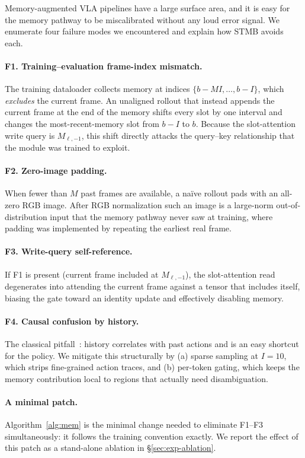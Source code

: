 \documentclass[11pt]{article}
\begin{document}
Memory-augmented VLA pipelines have a large surface area, and it is easy for
the memory pathway to be miscalibrated without any loud error signal. We
enumerate four failure modes we encountered and explain how STMB avoids each.

\paragraph{F1. Training--evaluation frame-index mismatch.}
The training dataloader collects memory at indices $\{b - M I, \dots, b - I\}$,
which \emph{excludes} the current frame. An unaligned rollout that instead
appends the current frame at the end of the memory shifts every slot by one
interval and changes the most-recent-memory slot from $b - I$ to $b$.
Because the slot-attention write query is $M_{\ell,-1}$, this shift directly
attacks the query--key relationship that the module was trained to exploit.

\paragraph{F2. Zero-image padding.}
When fewer than $M$ past frames are available, a na\"ive rollout pads with an
all-zero RGB image. After RGB normalization such an image is a large-norm
out-of-distribution input that the memory pathway never saw at training, where
padding was implemented by repeating the earliest real frame.

\paragraph{F3. Write-query self-reference.}
If F1 is present (current frame included at $M_{\ell,-1}$), the slot-attention
read degenerates into attending the current frame against a tensor that
includes itself, biasing the gate toward an identity update and effectively
disabling memory.

\paragraph{F4. Causal confusion by history.}
The classical pitfall~\cite{dehaan2019causal}: history correlates with past
actions and is an easy shortcut for the policy. We mitigate this structurally
by (a) sparse sampling at $I{=}10$, which strips fine-grained action traces,
and (b) per-token gating, which keeps the memory contribution local to regions
that actually need disambiguation.

\paragraph{A minimal patch.}
Algorithm~\ref{alg:mem} is the minimal change needed to eliminate F1--F3
simultaneously: it follows the training convention exactly. We report the
effect of this patch as a stand-alone ablation in \S\ref{sec:exp-ablation}.
\end{document}
